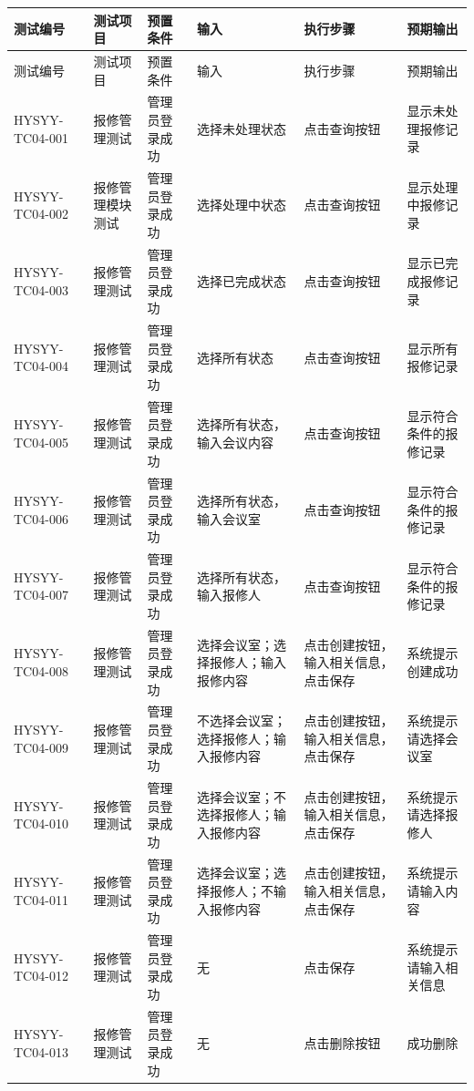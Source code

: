 \documentclass{izdthesis}
\begin{document}
{\songti
\begin{longtable}{|p{2.3cm}|p{1.8cm}|p{1.9cm}|p{3.2cm}|p{2.1cm}|p{2.3cm}|}
  \hline
  测试编号 & 测试项目 & 预置条件 & 输入 & 执行步骤 & 预期输出 \\
  \hline
  \endfirsthead
  \hline
  测试编号 & 测试项目 & 预置条件 & 输入 & 执行步骤 & 预期输出 \\
  \hline
  \endhead
  HYSYY-TC04-001 & 报修管理测试 & 管理员登录成功 & 选择未处理状态 & 点击查询按钮 & 显示未处理报修记录 \\
  \hline
  HYSYY-TC04-002 & 报修管理模块测试 & 管理员登录成功 & 选择处理中状态 & 点击查询按钮 & 显示处理中报修记录 \\
  \hline
  HYSYY-TC04-003 & 报修管理测试 & 管理员登录成功 & 选择已完成状态 & 点击查询按钮 & 显示已完成报修记录 \\
  \hline
  HYSYY-TC04-004 & 报修管理测试 & 管理员登录成功 & 选择所有状态 & 点击查询按钮 & 显示所有报修记录 \\
  \hline
  HYSYY-TC04-005 & 报修管理测试 & 管理员登录成功 & 选择所有状态，输入会议内容 & 点击查询按钮 & 显示符合条件的报修记录 \\
  \hline
  HYSYY-TC04-006 & 报修管理测试 & 管理员登录成功 & 选择所有状态，输入会议室 & 点击查询按钮 & 显示符合条件的报修记录 \\
  \hline
  HYSYY-TC04-007 & 报修管理测试 & 管理员登录成功 & 选择所有状态，输入报修人 & 点击查询按钮 & 显示符合条件的报修记录 \\
  \hline
  HYSYY-TC04-008 & 报修管理测试 & 管理员登录成功 & 选择会议室；选择报修人；输入报修内容 & 点击创建按钮，输入相关信息，点击保存 & 系统提示创建成功 \\
  \hline
  HYSYY-TC04-009 & 报修管理测试 & 管理员登录成功 & 不选择会议室；选择报修人；输入报修内容 & 点击创建按钮，输入相关信息，点击保存 & 系统提示请选择会议室 \\
  \hline
  HYSYY-TC04-010 & 报修管理测试 & 管理员登录成功 & 选择会议室；不选择报修人；输入报修内容 & 点击创建按钮，输入相关信息，点击保存 & 系统提示请选择报修人 \\
  \hline
  HYSYY-TC04-011 & 报修管理测试 & 管理员登录成功 & 选择会议室；选择报修人；不输入报修内容 & 点击创建按钮，输入相关信息，点击保存 & 系统提示请输入内容 \\
  \hline
  HYSYY-TC04-012 & 报修管理测试 & 管理员登录成功 & 无 & 点击保存 & 系统提示请输入相关信息 \\
  \hline
  HYSYY-TC04-013 & 报修管理测试 & 管理员登录成功 & 无 & 点击删除按钮 & 成功删除 \\

\end{longtable}}
\end{document}
